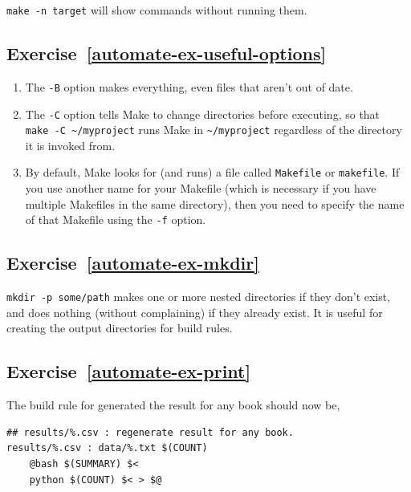\documentclass[
]{krantz}
\begin{document}
\texttt{make\ -n\ target} will show commands without running them.

\hypertarget{exercise-refautomate-ex-useful-options}{%
\subsection*{Exercise~\ref{automate-ex-useful-options}}\label{exercise-refautomate-ex-useful-options}}


\begin{enumerate}
\def\labelenumi{\arabic{enumi}.}
\item
  The \texttt{-B} option makes everything, even files that aren't out of date.
\item
  The \texttt{-C} option tells Make to change directories before executing,
  so that \texttt{make\ -C\ \textasciitilde{}/myproject} runs Make in \texttt{\textasciitilde{}/myproject}
  regardless of the directory it is invoked from.
\item
  By default, Make looks for (and runs) a file called \texttt{Makefile} or \texttt{makefile}.
  If you use another name for your Makefile
  (which is necessary if you have multiple Makefiles in the same directory),
  then you need to specify the name of that Makefile using the \texttt{-f} option.
\end{enumerate}

\hypertarget{exercise-refautomate-ex-mkdir}{%
\subsection*{Exercise~\ref{automate-ex-mkdir}}\label{exercise-refautomate-ex-mkdir}}


\texttt{mkdir\ -p\ some/path} makes one or more nested directories if they don't exist,
and does nothing (without complaining) if they already exist.
It is useful for creating the output directories for build rules.

\hypertarget{exercise-refautomate-ex-print}{%
\subsection*{Exercise~\ref{automate-ex-print}}\label{exercise-refautomate-ex-print}}


The build rule for generated the result for any book should now be,

\begin{verbatim}
## results/%.csv : regenerate result for any book.
results/%.csv : data/%.txt $(COUNT)
    @bash $(SUMMARY) $<
    python $(COUNT) $< > $@
\end{verbatim}
\end{document}
